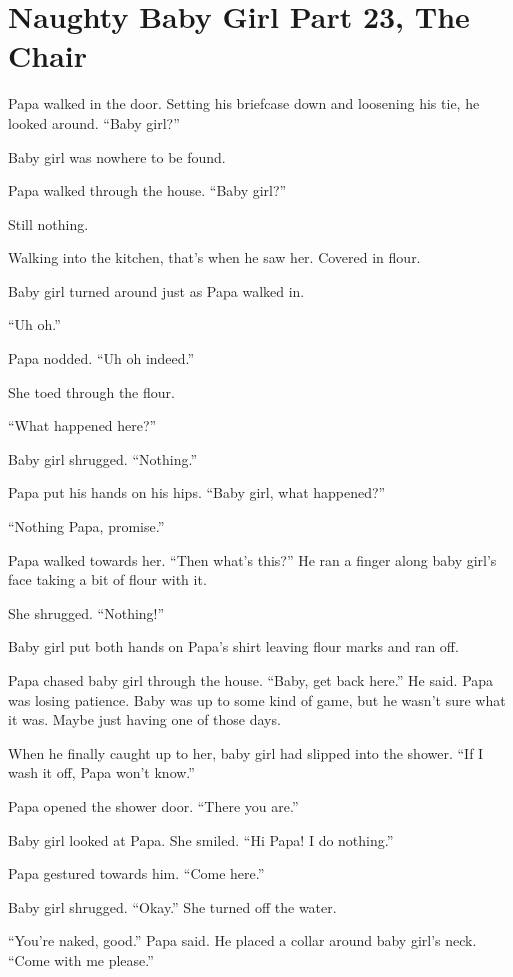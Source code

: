 \section{Naughty Baby Girl Part 23, The Chair}

    Papa walked in the door. Setting his briefcase down and loosening his tie, he looked around. “Baby girl?”

    Baby girl was nowhere to be found.

    Papa walked through the house. “Baby girl?”

    Still nothing.

    Walking into the kitchen, that’s when he saw her. Covered in flour.

    Baby girl turned around just as Papa walked in.

    “Uh oh.”

    Papa nodded. “Uh oh indeed.”

    She toed through the flour.

    “What happened here?”

    Baby girl shrugged. “Nothing.”

    Papa put his hands on his hips. “Baby girl, what happened?”

    “Nothing Papa, promise.”

    Papa walked towards her. “Then what’s this?” He ran a finger along baby girl’s face taking a bit of flour with it.

    She shrugged. “Nothing!”

    Baby girl put both hands on Papa’s shirt leaving flour marks and ran off.

    Papa chased baby girl through the house. “Baby, get back here.” He said. Papa was losing patience. Baby was up to some kind of game, but he wasn’t sure what it was. Maybe just having one of those days.

    When he finally caught up to her, baby girl had slipped into the shower. “If I wash it off, Papa won’t know.”

    Papa opened the shower door. “There you are.”

    Baby girl looked at Papa. She smiled. “Hi Papa! I do nothing.”

    Papa gestured towards him. “Come here.”

    Baby girl shrugged. “Okay.” She turned off the water.

    “You’re naked, good.” Papa said. He placed a collar around baby girl’s neck. “Come with me please.”

